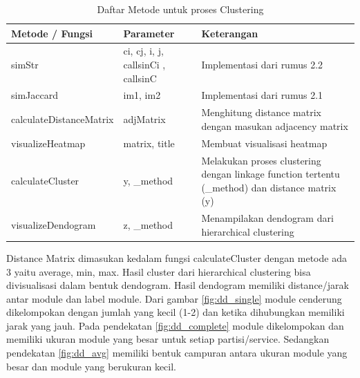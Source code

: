\begingroup
\setlength{\LTleft}{-20cm plus -1fill}
\setlength{\LTright}{\LTleft}
\begin{small}
	\begin{longtable}{|p{4cm}|p{3cm}|p{6cm}|}
		\caption{Daftar Metode untuk proses Clustering}\\
		\hline
		\textbf{Metode / Fungsi} & \textbf{Parameter} & \textbf{Keterangan}\\
		\endfirsthead
		
		\hline  

		simStr
		& ci, cj, i, j, callsinCi , callsinC
		 & Implementasi dari rumus 2.2  \\

		 \hline  

		 simJaccard
		& im1, im2
		 & Implementasi dari rumus 2.1   \\

		 \hline  

		 calculateDistanceMatrix
		& adjMatrix
		 & Menghitung distance matrix dengan masukan adjacency matrix  \\

		 \hline  

		 visualizeHeatmap
		& matrix, title
		 & Membuat visualisasi heatmap  \\

		 \hline  

		 calculateCluster
		& y, {\_}method
		 & Melakukan proses clustering dengan linkage function tertentu ({\_}method) dan distance matrix (y) \\

		 \hline
		
		 visualizeDendogram
		& z, {\_}method
		 & Menampilakan dendogram dari hierarchical clustering  \\

		 \hline
	\end{longtable}
\end{small}
\endgroup

Distance Matrix dimasukan kedalam fungsi calculateCluster dengan metode ada 3 yaitu average, min, max. Hasil cluster dari hierarchical clustering bisa divisualisasi dalam bentuk dendogram. Hasil dendogram memiliki distance/jarak antar module dan label module. Dari gambar \ref{fig:dd_single} module cenderung dikelompokan dengan jumlah yang kecil (1-2) dan ketika dihubungkan memiliki jarak yang jauh. Pada pendekatan \ref{fig:dd_complete} module dikelompokan dan memiliki ukuran module yang besar untuk setiap partisi/service. Sedangkan pendekatan \ref{fig:dd_avg} memiliki bentuk campuran antara ukuran module yang besar dan module yang berukuran kecil.

